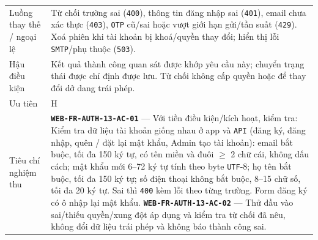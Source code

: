 \begin{longtable}{@{}P{0.23000\SRSWidth}P{0.77000\SRSWidth}@{}}
Luồng thay thế /\allowbreak{} ngoại lệ & Từ chối trường sai (\texttt{400}), thông tin đăng nhập sai (\texttt{401}), email chưa xác thực (\texttt{403}), \texttt{OTP} cũ/\allowbreak{}sai hoặc vượt giới hạn gửi/\allowbreak{}tần suất (\texttt{429}). Xoá phiên khi tài khoản bị khoá/\allowbreak{}quyền thay đổi; hiển thị lỗi \texttt{SMTP}/\allowbreak{}phụ thuộc (\texttt{503}). \\[3pt]
Hậu điều kiện & Kết quả thành công quan sát được khớp yêu cầu này; chuyển trạng thái được chỉ định được lưu. Từ chối không cấp quyền hoặc để thay đổi dở dang trái phép. \\[3pt]
Ưu tiên & H \\[3pt]
Tiêu chí nghiệm thu & \textbf{\texttt{WEB-\allowbreak{}FR-\allowbreak{}AUTH-\allowbreak{}13-\allowbreak{}AC-\allowbreak{}01}} — Với tiền điều kiện/\allowbreak{}kích hoạt, kiểm tra: Kiểm tra dữ liệu tài khoản giống nhau ở app và \texttt{API} (đăng ký, đăng nhập, quên /\allowbreak{} đặt lại mật khẩu, Admin tạo tài khoản): email bắt buộc, tối đa 150 ký tự, có tên miền và đuôi \ensuremath{\geq} 2 chữ cái, không dấu cách; mật khẩu mới 6–72 ký tự tính theo byte \texttt{UTF}-8; họ tên bắt buộc, tối đa 150 ký tự; số điện thoại không bắt buộc, 8–15 chữ số, tối đa 20 ký tự. Sai thì \texttt{400} kèm lỗi theo từng trường. Form đăng ký có ô nhập lại mật khẩu. \textbf{\texttt{WEB-\allowbreak{}FR-\allowbreak{}AUTH-\allowbreak{}13-\allowbreak{}AC-\allowbreak{}02}} — Thử đầu vào sai/\allowbreak{}thiếu quyền/\allowbreak{}xung đột áp dụng và kiểm tra từ chối đã nêu, không đổi dữ liệu trái phép và không báo thành công sai. \\[3pt]

\end{longtable}
